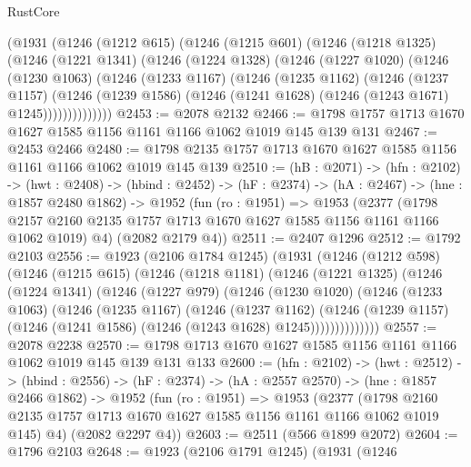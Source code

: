 \begin{lexlean}{RustCore}
\begin{coremodule}
    (@1931
      (@1246
        (@1212 @615)
        (@1246
          (@1215 @601)
          (@1246
            (@1218 @1325)
            (@1246
              (@1221 @1341)
              (@1246
                (@1224 @1328)
                (@1246
                  (@1227 @1020)
                  (@1246
                    (@1230 @1063)
                    (@1246
                      (@1233 @1167)
                      (@1246
                        (@1235 @1162)
                        (@1246
                          (@1237 @1157)
                          (@1246
                            (@1239 @1586)
                            (@1246 (@1241 @1628) (@1246 (@1243 @1671) @1245))))))))))))))
@2453 := @2078 @2132
@2466 := @1798 @1757 @1713 @1670 @1627 @1585 @1156 @1161 @1166 @1062 @1019 @145 @139 @131
@2467 := @2453 @2466
@2480 := @1798 @2135 @1757 @1713 @1670 @1627 @1585 @1156 @1161 @1166 @1062 @1019 @145 @139
@2510 := (hB : @2071) ->
  (hfn : @2102) ->
  (hwt : @2408) ->
  (hbind : @2452) ->
  (hF : @2374) ->
  (hA : @2467) ->
  (hne : @1857 @2480 @1862) ->
  @1952
    (fun (ro : @1951) =>
    @1953
      (@2377
        (@1798 @2157 @2160 @2135 @1757 @1713 @1670 @1627 @1585 @1156 @1161 @1166 @1062 @1019)
        @4)
      (@2082 @2179 @4))
@2511 := @2407 @1296
@2512 := @1792 @2103
@2556 := @1923
    (@2106 @1784 @1245)
    (@1931
      (@1246
        (@1212 @598)
        (@1246
          (@1215 @615)
          (@1246
            (@1218 @1181)
            (@1246
              (@1221 @1325)
              (@1246
                (@1224 @1341)
                (@1246
                  (@1227 @979)
                  (@1246
                    (@1230 @1020)
                    (@1246
                      (@1233 @1063)
                      (@1246
                        (@1235 @1167)
                        (@1246
                          (@1237 @1162)
                          (@1246
                            (@1239 @1157)
                            (@1246 (@1241 @1586) (@1246 (@1243 @1628) @1245))))))))))))))
@2557 := @2078 @2238
@2570 := @1798 @1713 @1670 @1627 @1585 @1156 @1161 @1166 @1062 @1019 @145 @139 @131 @133
@2600 := (hfn : @2102) ->
  (hwt : @2512) ->
  (hbind : @2556) ->
  (hF : @2374) ->
  (hA : @2557 @2570) ->
  (hne : @1857 @2466 @1862) ->
  @1952
    (fun (ro : @1951) =>
    @1953
      (@2377
        (@1798 @2160 @2135 @1757 @1713 @1670 @1627 @1585 @1156 @1161 @1166 @1062 @1019 @145)
        @4)
      (@2082 @2297 @4))
@2603 := @2511 (@566 @1899 @2072)
@2604 := @1796 @2103
@2648 := @1923
    (@2106 @1791 @1245)
    (@1931
      (@1246

\end{coremodule}
\end{lexlean}
